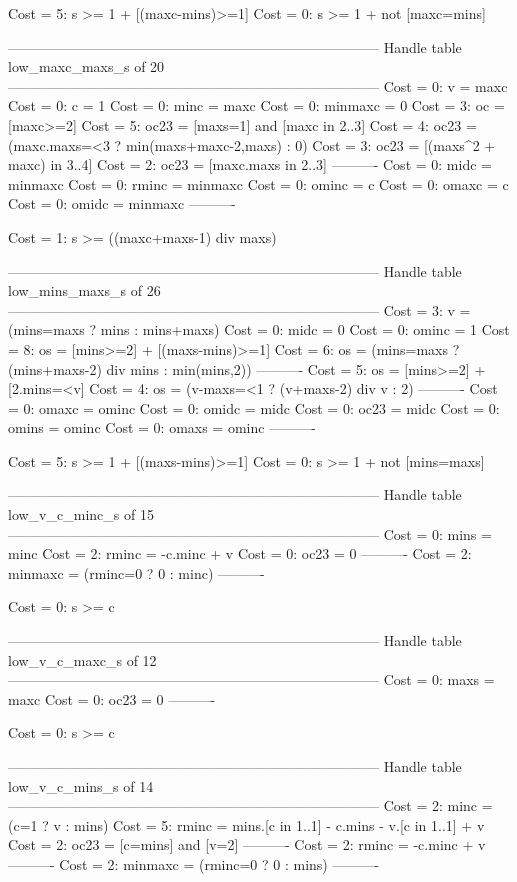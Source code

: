Cost =  5:  s >= 1 + [(maxc-mins)>=1]
Cost =  0:  s >= 1 + not [maxc=mins]

--------------------------------------------------------------------------------
Handle table low_maxc_maxs_s of 20
--------------------------------------------------------------------------------
Cost =  0:  v       = maxc
Cost =  0:  c       = 1
Cost =  0:  minc    = maxc
Cost =  0:  minmaxc = 0
Cost =  3:  oc      = [maxc>=2]
Cost =  5:  oc23    = [maxs=1] and [maxc in 2..3]
Cost =  4:  oc23    = (maxc.maxs=<3 ? min(maxs+maxc-2,maxs) : 0)
Cost =  3:  oc23    = [(maxs^2 + maxc) in 3..4]
Cost =  2:  oc23    = [maxc.maxs in 2..3]
----------
Cost =  0:  midc    = minmaxc
Cost =  0:  rminc   = minmaxc
Cost =  0:  ominc   = c
Cost =  0:  omaxc   = c
Cost =  0:  omidc   = minmaxc
----------

Cost =  1:  s >= ((maxc+maxs-1) div maxs)

--------------------------------------------------------------------------------
Handle table low_mins_maxs_s of 26
--------------------------------------------------------------------------------
Cost =  3:  v     = (mins=maxs ? mins : mins+maxs)
Cost =  0:  midc  = 0
Cost =  0:  ominc = 1
Cost =  8:  os    = [mins>=2] + [(maxs-mins)>=1]
Cost =  6:  os    = (mins=maxs ? (mins+maxs-2) div mins : min(mins,2))
----------
Cost =  5:  os    = [mins>=2] + [2.mins=<v]
Cost =  4:  os    = (v-maxs=<1 ? (v+maxs-2) div v : 2)
----------
Cost =  0:  omaxc = ominc
Cost =  0:  omidc = midc
Cost =  0:  oc23  = midc
Cost =  0:  omins = ominc
Cost =  0:  omaxs = ominc
----------

Cost =  5:  s >= 1 + [(maxs-mins)>=1]
Cost =  0:  s >= 1 + not [mins=maxs]

--------------------------------------------------------------------------------
Handle table low_v_c_minc_s of 15
--------------------------------------------------------------------------------
Cost =  0:  mins    = minc
Cost =  2:  rminc   = -c.minc + v
Cost =  0:  oc23    = 0
----------
Cost =  2:  minmaxc = (rminc=0 ? 0 : minc)
----------

Cost =  0:  s >= c

--------------------------------------------------------------------------------
Handle table low_v_c_maxc_s of 12
--------------------------------------------------------------------------------
Cost =  0:  maxs = maxc
Cost =  0:  oc23 = 0
----------

Cost =  0:  s >= c

--------------------------------------------------------------------------------
Handle table low_v_c_mins_s of 14
--------------------------------------------------------------------------------
Cost =  2:  minc    = (c=1 ? v : mins)
Cost =  5:  rminc   = mins.[c in 1..1] - c.mins - v.[c in 1..1] + v
Cost =  2:  oc23    = [c=mins] and [v=2]
----------
Cost =  2:  rminc   = -c.minc + v
----------
Cost =  2:  minmaxc = (rminc=0 ? 0 : mins)
----------


